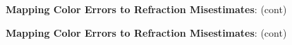 \documentclass[DM,toc]{lsstdoc}
\begin{document}
\begin{figure}
    \ContinuedFloat
    \centering
    \caption[]{\textbf{Mapping Color Errors to Refraction Misestimates}: (cont)}
    \label{rerr2}
\end{figure}
\begin{figure}
    \ContinuedFloat
    \centering
    \caption[]{\textbf{Mapping Color Errors to Refraction Misestimates}: (cont)}
    \label{rerr2}
\end{figure}
\clearpage
\end{document}
